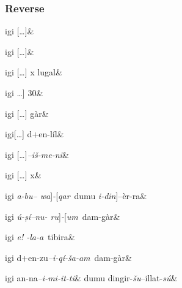 \documentclass{memoir}
\begin{document}
\subsubsection{Reverse}
\begin{pairs}
  \OnehalfSpacing
  \begin{Leftside}
    \resumenumbering
    \begin{astanza}
      igi [\dots]\&
    \end{astanza}
    \begin{astanza}
      igi [\dots]\&
    \end{astanza}
    \begin{astanza}
      igi [\dots] x lugal\&
    \end{astanza}
    \begin{astanza}
    igi \dots ] 30\&
  \end{astanza}
  \begin{astanza}
    igi [\dots] gàr\&
  \end{astanza}
  \begin{astanza}
    igi[\dots] d+en-líl\&
  \end{astanza}
  \begin{astanza}
    igi [\dots]\emph{--iš-me-ni}\&
  \end{astanza}
  \begin{astanza}
    igi [\dots]\emph{--}{\sffamily [}\emph{i-ri-ba-am}\&
    \end{astanza}
    \begin{astanza}
      igi [\dots] x\&
    \end{astanza}
    \begin{astanza}
    igi \emph{a-bu-- wa}{\sffamily ]}\emph{-}{\sffamily [}\emph{qar}\ dumu \emph{i-din}{\sffamily ]}--èr-ra\&
  \end{astanza}
  \begin{astanza}
  igi \emph{ú-ṣí--nu- ru}{\sffamily ]}\emph{-}{\sffamily [}\emph{um}\  dam-gàr\&
  \end{astanza}
  \begin{astanza}
    igi \emph{e! -la-a}\ tibira\&
  \end{astanza}
  \begin{astanza}
    igi d+en-zu\emph{--i-qí-ša-am}\ dam-gàr\&
  \end{astanza}
  \begin{astanza}
    igi an-na\emph{--i-mi-it-ti}&
    \quad dumu dingir-\emph{šu}--illat-\emph{sú}\&
  \end{astanza}

\end{Leftside}
\end{pairs}
\end{document}
